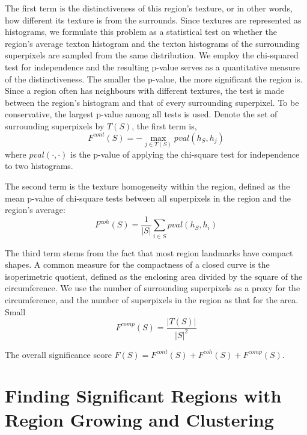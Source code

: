\documentclass{llncs}
\begin{document}
The first term is the distinctiveness of this region's texture, or in other words, how different its texture is from the surrounds. Since textures are represented as histograms, we formulate this problem as a statistical test on whether the region's average texton histogram and the texton histograms of the surrounding superpixels are sampled from the same distribution. We employ the chi-squared test for independence and the resulting p-value serves as a quantitative measure of the distinctiveness. The smaller the p-value, the more significant the region is. Since a region often has neighbours with different textures, the test is made between the region's histogram and that of every surrounding superpixel. To be conservative, the largest p-value among all tests is used. Denote the set of surrounding superpixels by $T(S)$, the first term is,
$$F^{cont}(S) = - \max_{j\in T(S)} pval(h_S, h_j)$$
where $pval(\cdot,\cdot)$ is the p-value of applying the chi-square test for independence to two histograms.

The second term is the texture homogeneity within the region, defined as the mean p-value of chi-square tests between all superpixels in the region and the region's average:
$$F^{coh}(S) = \frac{1}{|S|} \sum_{i\in S} pval(h_S, h_i)$$

The third term stems from the fact that most region landmarks have compact shapes. A common measure for the compactness of a closed curve is the isoperimetric quotient, defined as the enclosing area divided by the square of the circumference. We use the number of surrounding superpixels as a proxy for the circumference, and the number of superpixels in the region as that for the area. Small 
$$F^{comp}(S) = \frac{|T(S)|}{|S|^2}$$

The overall significance score $F(S) = F^{cont}(S) + F^{coh}(S) + F^{comp}(S)$.


\section{Finding Significant Regions with Region Growing and Clustering}
\end{document}
